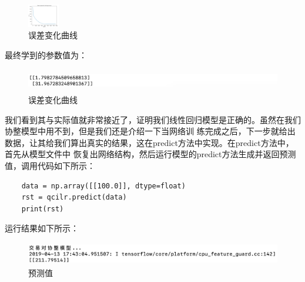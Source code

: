 \documentclass{article}
\begin{document}
\begin{figure}[H]
	\caption{误差变化曲线}
	\label{f000046}
	\centering
	\includegraphics[height=1cm]{images/f000046}
\end{figure}
最终学到的参数值为：
\begin{figure}[H]
	\caption{误差变化曲线}
	\label{f000047}
	\centering
	\includegraphics[height=1cm]{images/f000047}
\end{figure}
我们看到其与实际值就非常接近了，证明我们线性回归模型是正确的。虽然在我们协整模型中用不到，但是我们还是介绍一下当网络训
练完成之后，下一步就给出数据，让其给我们算出真实的结果，这在predict方法中实现。在predict方法中，首先从模型文件中
恢复出网络结构，然后运行模型的predict方法生成并返回预测值，调用代码如下所示：
\begin{lstlisting}
    data = np.array([[100.0]], dtype=float)
    rst = qcilr.predict(data)
    print(rst)
\end{lstlisting}
运行结果如下所示：
\begin{figure}[H]
	\caption{预测值}
	\label{f000048}
	\centering
	\includegraphics[height=1cm]{images/f000048}
\end{figure}
\end{document}
